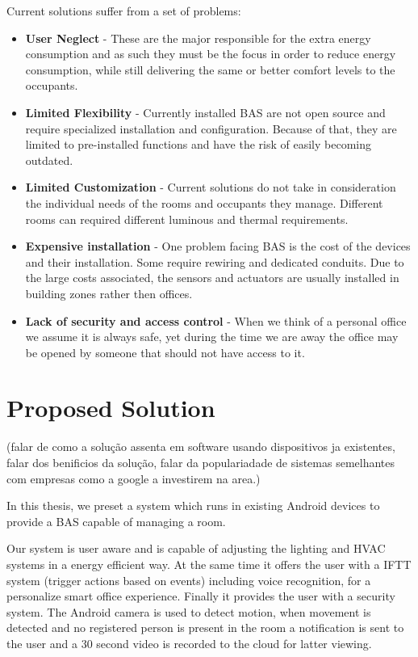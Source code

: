 Current solutions suffer from a set of problems:
\begin{itemize}
\item \textbf{User Neglect} - These are the major responsible for the extra energy consumption and as such they must be the focus in order to reduce energy consumption, while still delivering the same or better comfort levels to the occupants.
\item \textbf{Limited Flexibility} - Currently installed BAS are not open source and require specialized installation and configuration. Because of that, they are limited to pre-installed functions and have the risk of easily becoming outdated.
\item \textbf{Limited Customization} - Current solutions do not take in consideration the individual needs of the rooms and occupants they manage. Different rooms can required different luminous and thermal requirements. 
\item \textbf{Expensive installation} - One problem facing BAS is the cost of the devices and their installation. Some require rewiring  and dedicated conduits. Due to the large costs associated, the sensors and actuators are usually installed in building zones rather then offices.
\item \textbf{Lack of security and access control} - When we think of a personal office we assume it is always safe, yet during the time we are away the office may be opened by someone that should not have access to it.  
\end{itemize}



\section{Proposed Solution}
\label{section:proposed}
(falar de como a solução assenta em software usando dispositivos ja existentes, falar dos benificios da solução, falar da populariadade de sistemas semelhantes com empresas como a google a investirem na area.)


In this thesis, we preset a system which runs in existing Android devices to provide a \ac{BAS} capable of managing a room. 

Our system is user aware and is capable of adjusting the lighting and \ac{HVAC} systems in a energy efficient way. At the same time it offers the user with a \ac{IFTT} system (trigger actions based on events) including voice recognition, for a personalize smart office experience. Finally it provides the user with a security system. The Android camera is used to detect motion, when movement is detected and no registered person is present in the room a notification is sent to the user and a 30 second video is recorded to the cloud for latter viewing.

